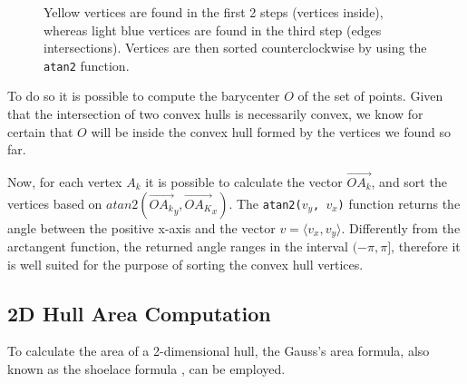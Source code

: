\documentclass[acmtog, anonymous, review]{acmart}
\begin{document}
\begin{figure}[H]
  \centering
  \caption{Yellow vertices are found in the first 2 steps (vertices inside), whereas light blue vertices are found in the third step (edges intersections). Vertices are then sorted counterclockwise by using the \texttt{atan2} function.}
  \label{fig:overlapping_hull}
\end{figure}

To do so it is possible to compute the barycenter $O$ of the set of points. Given that the intersection of two convex hulls is necessarily convex, we know for certain that $O$ will be inside the convex hull formed by the vertices we found so far.

Now, for each vertex $A_k$ it is possible to calculate the vector $\overrightarrow{OA_k}$, and sort the vertices based on $atan2(\overrightarrow{OA_k}_y, \overrightarrow{OA_K}_x)$. The \texttt{atan2($v_y$, $v_x$)} function returns the angle between the positive x-axis and the vector $v=\langle v_x, v_y \rangle$. Differently from the arctangent function, the returned angle ranges in the interval $(-\pi, \pi]$, therefore it is well suited for the purpose of sorting the convex hull vertices.

\subsection{2D Hull Area Computation} \label{apx:hull_area_computation}
To calculate the area of a 2-dimensional hull, the Gauss's area formula, also known as the shoelace formula \cite{shoelace}, can be employed.
\end{document}
